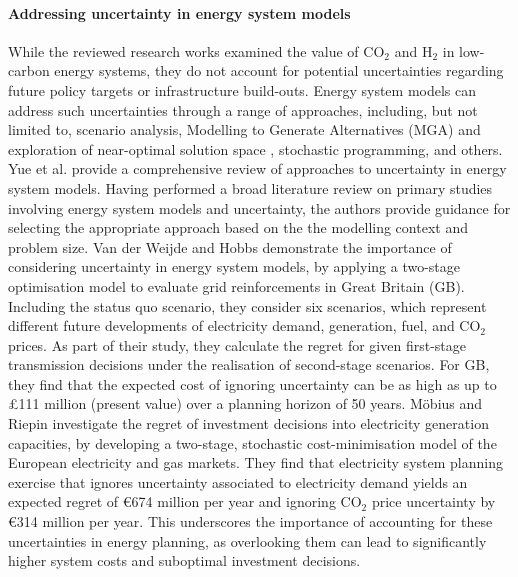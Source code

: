 \documentclass[pdflatex,sn-nature]{sn-jnl}%
\theoremstyle{thmstyleone}%
\theoremstyle{thmstyletwo}%
\theoremstyle{thmstylethree}%
\begin{document}
\paragraph{Addressing uncertainty in energy system models}
While the reviewed research works examined the value of CO$_2$ and H$_2$ in low-carbon energy systems, they do not account for potential uncertainties regarding future policy targets or infrastructure build-outs. 
Energy system models can address such uncertainties through a range of approaches, including, but not limited to, scenario analysis, Modelling to Generate Alternatives (MGA) and exploration of near-optimal solution space \cite{neumannNearoptimalFeasibleSpace2021,greevenbroekLittleLoseCase2024,priceModellingGenerateAlternatives2017}, stochastic programming, and others. 
Yue et al. \cite{yueReviewApproachesUncertainty2018} provide a comprehensive review of approaches to uncertainty in energy system models. Having performed a broad literature review on primary studies involving energy system models and uncertainty, the authors provide guidance for selecting the appropriate approach based on the the modelling context and problem size.
Van der Weijde and Hobbs \cite{vanderweijdeEconomicsPlanningElectricity2012} demonstrate the importance of considering uncertainty in energy system models, by applying a two-stage optimisation model to evaluate grid reinforcements in Great Britain (GB). Including the status quo scenario, they consider six scenarios, which represent different future developments of electricity demand, generation, fuel, and CO$_2$ prices. As part of their study, they calculate the regret for given first-stage transmission decisions under the realisation of second-stage scenarios. For GB, they find that the expected cost of ignoring uncertainty can be as high as up to \pounds111 million (present value) over a planning horizon of 50 years.
Möbius and Riepin \cite{mobiusRegretAnalysisInvestment2020} investigate the regret of investment decisions into electricity generation capacities, by developing a two-stage, stochastic cost-minimisation model of the European electricity and gas markets. They find that electricity system planning exercise that ignores uncertainty associated to electricity demand yields an expected regret of €674 million per year and ignoring CO$_2$ price uncertainty by €314 million per year. This underscores the importance of accounting for these uncertainties in energy planning, as overlooking them can lead to significantly higher system costs and suboptimal investment decisions. 
\end{document}
